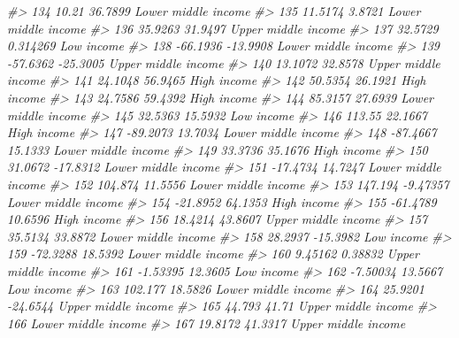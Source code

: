 \documentclass[
  xelatex, ja=standard]{bxjsbook}
\newenvironment{Shaded}{\begin{snugshade}}{\end{snugshade}}
\newcommand{\CommentTok}[1]{\textcolor[rgb]{0.56,0.35,0.01}{\textit{#1}}}
\theoremstyle{definition}
\theoremstyle{definition}
\theoremstyle{definition}
\theoremstyle{definition}
\theoremstyle{remark}
\begin{document}
\begin{Shaded}
\begin{Highlighting}[]
\CommentTok{\#\textgreater{} 134      10.21    36.7899 Lower middle income}
\CommentTok{\#\textgreater{} 135    11.5174     3.8721 Lower middle income}
\CommentTok{\#\textgreater{} 136    35.9263    31.9497 Upper middle income}
\CommentTok{\#\textgreater{} 137    32.5729   0.314269          Low income}
\CommentTok{\#\textgreater{} 138   {-}66.1936   {-}13.9908 Lower middle income}
\CommentTok{\#\textgreater{} 139   {-}57.6362   {-}25.3005 Upper middle income}
\CommentTok{\#\textgreater{} 140    13.1072    32.8578 Upper middle income}
\CommentTok{\#\textgreater{} 141    24.1048    56.9465         High income}
\CommentTok{\#\textgreater{} 142    50.5354    26.1921         High income}
\CommentTok{\#\textgreater{} 143    24.7586    59.4392         High income}
\CommentTok{\#\textgreater{} 144    85.3157    27.6939 Lower middle income}
\CommentTok{\#\textgreater{} 145    32.5363    15.5932          Low income}
\CommentTok{\#\textgreater{} 146     113.55    22.1667         High income}
\CommentTok{\#\textgreater{} 147   {-}89.2073    13.7034 Lower middle income}
\CommentTok{\#\textgreater{} 148   {-}87.4667    15.1333 Lower middle income}
\CommentTok{\#\textgreater{} 149    33.3736    35.1676         High income}
\CommentTok{\#\textgreater{} 150    31.0672   {-}17.8312 Lower middle income}
\CommentTok{\#\textgreater{} 151   {-}17.4734    14.7247 Lower middle income}
\CommentTok{\#\textgreater{} 152    104.874    11.5556 Lower middle income}
\CommentTok{\#\textgreater{} 153    147.194   {-}9.47357 Lower middle income}
\CommentTok{\#\textgreater{} 154   {-}21.8952    64.1353         High income}
\CommentTok{\#\textgreater{} 155   {-}61.4789    10.6596         High income}
\CommentTok{\#\textgreater{} 156    18.4214    43.8607 Upper middle income}
\CommentTok{\#\textgreater{} 157    35.5134    33.8872 Lower middle income}
\CommentTok{\#\textgreater{} 158    28.2937   {-}15.3982          Low income}
\CommentTok{\#\textgreater{} 159   {-}72.3288    18.5392 Lower middle income}
\CommentTok{\#\textgreater{} 160    9.45162    0.38832 Upper middle income}
\CommentTok{\#\textgreater{} 161   {-}1.53395    12.3605          Low income}
\CommentTok{\#\textgreater{} 162   {-}7.50034    13.5667          Low income}
\CommentTok{\#\textgreater{} 163    102.177    18.5826 Lower middle income}
\CommentTok{\#\textgreater{} 164    25.9201   {-}24.6544 Upper middle income}
\CommentTok{\#\textgreater{} 165     44.793      41.71 Upper middle income}
\CommentTok{\#\textgreater{} 166                       Lower middle income}
\CommentTok{\#\textgreater{} 167    19.8172    41.3317 Upper middle income}

\end{Highlighting}
\end{Shaded}
\end{document}
